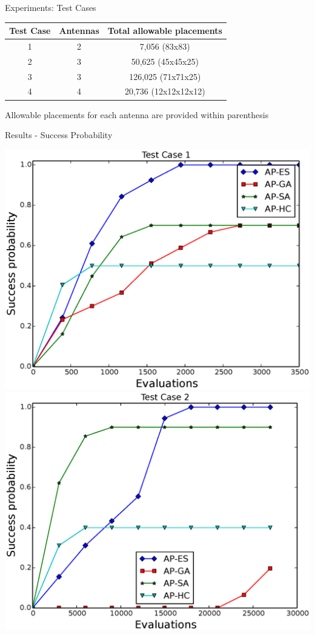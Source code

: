 \documentclass{beamer}
\begin{document}
        \begin{frame}{Experiments: Test Cases}
            \begin{table}
                \centering
                \begin{tabular}{|c|c|c|} \hline
                    Test Case&Antennas&Total allowable placements\\ \hline
                    1 & 2 & 7,056 (83x83) \\ \hline
                    2 & 3 & 50,625 (45x45x25) \\ \hline
                    3 & 3 & 126,025 (71x71x25) \\ \hline
                    4 & 4 & 20,736 (12x12x12x12) \\
                    \hline\end{tabular}
            \end{table}
            \small *Allowable placements for each antenna are provided within parenthesis
        \end{frame}
        \begin{frame}{Results - Success Probability}
            \begin{center}
                \includegraphics[width=.49\textwidth]{../paper/FIG/tc1_sp.eps}
                \includegraphics[width=.49\textwidth]{../paper/FIG/tc2_sp.eps}
            \end{center}
        \end{frame}
\end{document}
